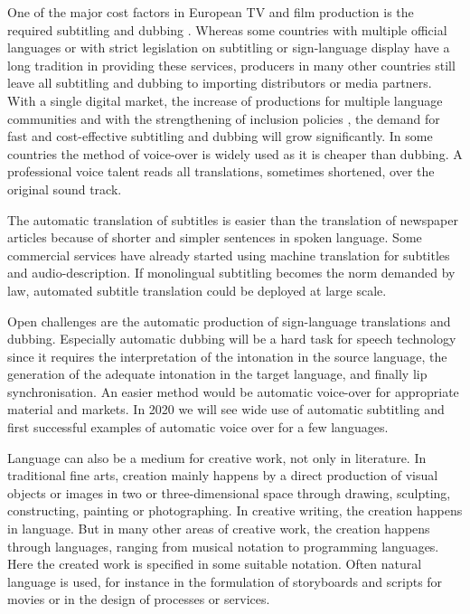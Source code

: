 \documentclass[10pt, plain]{../../metanetpaper}
\begin{document}
\begin{multicols}{2}
One of the major cost factors in European TV and film production is the required subtitling and dubbing \cite{eurobarometer2011}. Whereas some countries with multiple official languages or with strict legislation on subtitling or sign-language display have a long tradition in providing these services, producers in many other countries still leave all subtitling and dubbing to importing distributors or media partners. With a single digital market, the increase of productions for multiple language communities and with the strengthening of inclusion policies \cite{medier12}, the demand for fast and cost-effective subtitling and dubbing will grow significantly. In some countries the method of voice-over is widely used as it is cheaper than dubbing. A professional voice talent reads all translations, sometimes shortened, over the original sound track. 
 
The automatic translation of subtitles is easier than the translation of newspaper articles because of shorter and simpler sentences in spoken language. Some commercial services have already started using machine translation for subtitles and audio-description. If monolingual subtitling becomes the norm demanded by law, automated subtitle translation could be deployed at large scale.
 
Open challenges are the automatic production of sign-language translations and dubbing. Especially automatic dubbing will be a hard task for speech technology since it requires the interpretation of the intonation in the source language, the generation of the adequate intonation in the target language, and finally lip synchronisation. An easier method would be automatic voice-over for appropriate material and markets. In 2020 we will see wide use of automatic subtitling and first successful examples of automatic voice over for a few languages.
 
Language can also be a medium for creative work, not only in literature. In traditional fine arts, creation mainly happens by a direct production of visual objects or images in two or three-dimensional space through drawing, sculpting, constructing, painting or photographing. In creative writing, the creation happens in language. But in many other areas of creative work, the creation happens through languages, ranging from musical notation to programming languages. Here the created work is specified in some suitable notation. Often natural language is used, for instance in the formulation of storyboards and scripts for movies or in the design of processes or services.


\end{multicols}
\end{document}
